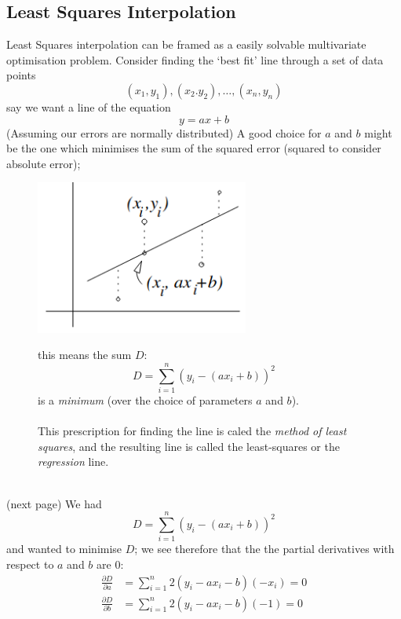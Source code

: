 \documentclass{report}
\begin{document}
\subsection{Least Squares Interpolation} %
Least Squares interpolation can be framed as a easily solvable multivariate optimisation problem. Consider finding
the `best fit' line through a set of data points
\begin{equation*}
(x_1,y_1),(x_2.y_2),\ldots,(x_n,y_n)
\end{equation*}
say we want a line of the equation
\begin{equation*}
y=ax+b
\end{equation*}
(Assuming our errors are normally distributed) A good choice for $a$ and $b$ might be the one which minimises
the sum of the squared error (squared to consider absolute error); 
\begin{figure}[h]
\begin{center}
\includegraphics[width=7cm]{102}\\
\end{center}
this means the sum $D$:
\begin{equation*}
D=\sum^n_{i=1}(y_i-(ax_i+b))^2
\end{equation*}
is a \textit{minimum} (over the choice of parameters $a$ and $b$).\\
\vspace{1mm}\\
This prescription for finding the line is caled the \textit{method of least squares}, and the
resulting line is called the least-squares or the \textit{regression} line.
\end{figure}\\
(next page)
\newpage
\noindent We had 
\begin{equation*}
D=\sum^n_{i=1}(y_i-(ax_i+b))^2
\end{equation*}
and wanted to minimise $D$; we see therefore that the the partial derivatives with respect to $a$ and $b$ are 0:
\begin{align*}
\frac{\partial D}{\partial a}&=\sum^n_{i=1}
2(y_i-ax_i-b)(-x_i)=0\\
\frac{\partial D}{\partial b}&=\sum^n_{i=1}
2(y_i-ax_i-b)(-1)=0
\end{align*}
\end{document}
